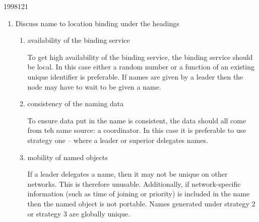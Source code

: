 \documentclass[10pt,\jkfside,a4paper]{article}
\begin{document}
\begin{examquestion}{1998}{12}{1}
\begin{enumerate}[label=(\alph*)]
\begin{itemize}
\end{itemize}

\item Discuss name to location binding under the headings

\begin{enumerate}[label=(\roman*)]

\item availability of the binding service

To get high availability of the binding service, the binding service should
be local. In this case either a random number or a function of an
existing unique identifier is preferable. If names are given by a leader
then the node may have to wait to be given a name.

\item consistency of the naming data

To ensure data put in the name is consistent, the data should all come from
teh same source: a coordinator. In this case it is preferable to use
strategy one -- where a leader or superior delegates names.

\item mobility of named objects

If a leader delegates a name, then it may not be unique on other networks.
This is therefore unusable. Additionally, if network-specific information
(such as time of joining or priority) is included in the name then the named
object is not portable. Names generated under strategy 2 or strategy 3 are
globally unique.

\end{enumerate}

\end{enumerate}

\end{examquestion}
\end{document}
